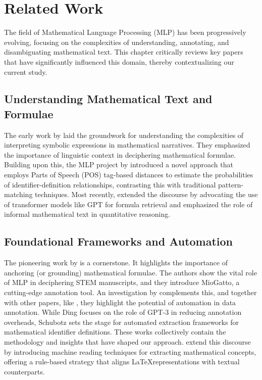\chapter{Related Work}\label{chapter:related_work}

The field of Mathematical Language Processing (MLP) has been progressively evolving, focusing on the complexities of understanding, annotating, and disambiguating mathematical text. This chapter critically reviews key papers that have significantly influenced this domain, thereby contextualizing our current study.

\section{Understanding Mathematical Text and Formulae}

The early work by \citet{grigore2009towards} laid the groundwork for understanding the complexities of interpreting symbolic expressions in mathematical narratives. They emphasized the importance of linguistic context in deciphering mathematical formulae. Building upon this, the MLP project by \citet{pagael2014mathematical} introduced a novel approach that employs Parts of Speech (POS) tag-based distances to estimate the probabilities of identifier-definition relationships, contrasting this with traditional pattern-matching techniques. Most recently, \citet{meadows2022survey} extended the discourse by advocating the use of transformer models like GPT for formula retrieval and emphasized the role of informal mathematical text in quantitative reasoning.

\section{Foundational Frameworks and Automation}

The pioneering work by \citet{asakura2020towards} is a cornerstone. It highlights the importance of anchoring (or grounding) mathematical formulae. The authors show the vital role of \ac{MLP} in deciphering \ac{STEM} manuscripts, and they introduce MioGatto, a cutting-edge annotation tool. An investigation by \citet{ding2022gpt} complements this, and together with other papers, like \citet{schubotz2017evaluating}, they highlight the potential of automation in data annotation. While Ding focuses on the role of GPT-3 in reducing annotation overheads, Schubotz sets the stage for automated extraction frameworks for mathematical identifier definitions. These works collectively contain the methodology and insights that have shaped our approach. \citet{alexeeva2020mathalign} extend this discourse by introducing machine reading techniques for extracting mathematical concepts, offering a rule-based strategy that aligns \LaTeX \space representations with textual counterparts.

